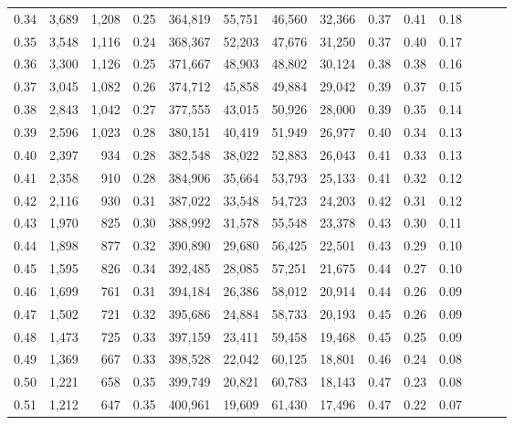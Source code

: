 \begin{tabular}{rrrrrrrrrrrrrr}
0.34 &   3,689 &  1,208 &  0.25 &  364,819 &   55,751 &  46,560 &  32,366 &  0.37 &  0.41 &      0.18 \\
0.35 &   3,548 &  1,116 &  0.24 &  368,367 &   52,203 &  47,676 &  31,250 &  0.37 &  0.40 &      0.17 \\
0.36 &   3,300 &  1,126 &  0.25 &  371,667 &   48,903 &  48,802 &  30,124 &  0.38 &  0.38 &      0.16 \\
0.37 &   3,045 &  1,082 &  0.26 &  374,712 &   45,858 &  49,884 &  29,042 &  0.39 &  0.37 &      0.15 \\
0.38 &   2,843 &  1,042 &  0.27 &  377,555 &   43,015 &  50,926 &  28,000 &  0.39 &  0.35 &      0.14 \\
0.39 &   2,596 &  1,023 &  0.28 &  380,151 &   40,419 &  51,949 &  26,977 &  0.40 &  0.34 &      0.13 \\
0.40 &   2,397 &    934 &  0.28 &  382,548 &   38,022 &  52,883 &  26,043 &  0.41 &  0.33 &      0.13 \\
0.41 &   2,358 &    910 &  0.28 &  384,906 &   35,664 &  53,793 &  25,133 &  0.41 &  0.32 &      0.12 \\
0.42 &   2,116 &    930 &  0.31 &  387,022 &   33,548 &  54,723 &  24,203 &  0.42 &  0.31 &      0.12 \\
0.43 &   1,970 &    825 &  0.30 &  388,992 &   31,578 &  55,548 &  23,378 &  0.43 &  0.30 &      0.11 \\
0.44 &   1,898 &    877 &  0.32 &  390,890 &   29,680 &  56,425 &  22,501 &  0.43 &  0.29 &      0.10 \\
0.45 &   1,595 &    826 &  0.34 &  392,485 &   28,085 &  57,251 &  21,675 &  0.44 &  0.27 &      0.10 \\
0.46 &   1,699 &    761 &  0.31 &  394,184 &   26,386 &  58,012 &  20,914 &  0.44 &  0.26 &      0.09 \\
0.47 &   1,502 &    721 &  0.32 &  395,686 &   24,884 &  58,733 &  20,193 &  0.45 &  0.26 &      0.09 \\
0.48 &   1,473 &    725 &  0.33 &  397,159 &   23,411 &  59,458 &  19,468 &  0.45 &  0.25 &      0.09 \\
0.49 &   1,369 &    667 &  0.33 &  398,528 &   22,042 &  60,125 &  18,801 &  0.46 &  0.24 &      0.08 \\
0.50 &   1,221 &    658 &  0.35 &  399,749 &   20,821 &  60,783 &  18,143 &  0.47 &  0.23 &      0.08 \\
0.51 &   1,212 &    647 &  0.35 &  400,961 &   19,609 &  61,430 &  17,496 &  0.47 &  0.22 &      0.07 \\

\end{tabular}
